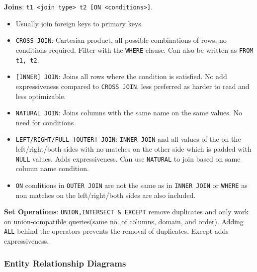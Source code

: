\begin{multicols*}{3}
\noindent\textbf{Joins}: \texttt{t1 <join type> t2 [ON <conditions>]}. 
\begin{itemize}[leftmargin=*]
    \item              Usually join foreign keys to primary keys.
    \item \texttt{CROSS JOIN}: Cartesian product, all possible combinations of rows, no conditions required. Filter with the \texttt{WHERE} clause. Can also be written as \texttt{FROM t1, t2}.
    \item  \texttt{[INNER] JOIN}: Joins all rows where the condition is satisfied. No add expressiveness compared to \texttt{CROSS JOIN}, less preferred  as harder to read and less optimizable.
    \item \texttt{NATURAL JOIN}: Joins columns with the same name on the same values. No need for conditions
    \item \texttt{LEFT/RIGHT/FULL [OUTER] JOIN}: \texttt{INNER JOIN} and all values of the on the left/right/both sides with no matches on the other side which is padded with \texttt{NULL} values. Adds expressiveness. Can use \texttt{NATURAL} to join based on same column name condition.
    \item \texttt{ON} conditions in \texttt{OUTER JOIN} are not the same as in \texttt{INNER JOIN} or \texttt{WHERE} as non matches on the left/right/both sides are also included.
\end{itemize}

\noindent\textbf{Set Operations}: \texttt{UNION,INTERSECT \& EXCEPT} remove duplicates and only work on \underline{union-compatible} queries(same no. of columns, domain, and order). Adding \texttt{ALL} behind the operators prevents the removal of duplicates. Except adds expressiveness.\\

\subsubsection{Entity Relationship Diagrams}
\end{multicols*}
